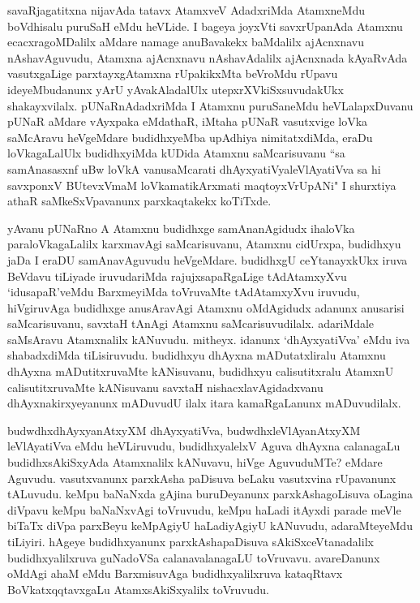 
\begin{artha}
savaRjagatitxna nijavAda tatavx AtamxveV AdadxriMda AtamxneMdu boVdhisalu puruSaH eMdu heVLide. I bageya joyxVti savxrUpanAda Atamxnu ecacxragoMDalilx aMdare namage anuBavakekx baMdalilx ajAcnxnavu nAshavAguvudu, Atamxna ajAcnxnavu nAshavAdalilx ajAcnxnada kAyaRvAda vasutxgaLige parxtayxgAtamxna rUpakikxMta beVroMdu rUpavu ideyeMbudanunx yArU yAvakAladalUlx utepxrXVkiSxsuvudakUkx shakayxvilalx. pUNaRnAdadxriMda I Atamxnu puruSaneMdu heVLalapxDuvanu pUNaR aMdare vAyxpaka eMdathaR, iMtaha pUNaR vasutxvige loVka saMcAravu heVgeMdare budidhxyeMba upAdhiya nimitatxdiMda, eraDu loVkagaLalUlx budidhxyiMda kUDida Atamxnu saMcarisuvanu ``sa samAnasasxnf uBw loVkA vanusaMcarati dhAyxyatiVyaleVlAyatiVva sa hi savxponxV BUtevxVmaM loVkamatikArxmati maqtoyxVrUpANi" I shurxtiya athaR saMkeSxVpavanunx parxkaqtakekx koTiTxde.
\end{artha}%



\begin{artha}
yAvanu pUNaRno A Atamxnu budidhxge samAnanAgidudx ihaloVka paraloVkagaLalilx karxmavAgi saMcarisuvanu, Atamxnu cidUrxpa, budidhxyu jaDa I eraDU samAnavAguvudu heVgeMdare. budidhxgU ceYtanayxkUkx iruva BeVdavu tiLiyade iruvudariMda rajujxsapaRgaLige tAdAtamxyXvu `idusapaR'veMdu BarxmeyiMda toVruvaMte tAdAtamxyXvu iruvudu, hiVgiruvAga budidhxge anusAravAgi Atamxnu oMdAgidudx adanunx anusarisi saMcarisuvanu, savxtaH tAnAgi Atamxnu saMcarisuvudilalx. adariMdale saMsAravu Atamxnalilx kANuvudu. mitheyx. idanunx `dhAyxyatiVva' eMdu iva shabadxdiMda tiLisiruvudu. budidhxyu dhAyxna mADutatxliralu Atamxnu dhAyxna mADutitxruvaMte kANisuvanu, budidhxyu calisutitxralu AtamxnU calisutitxruvaMte kANisuvanu savxtaH nishacxlavAgidadxvanu dhAyxnakirxyeyanunx mADuvudU ilalx itara kamaRgaLanunx mADuvudilalx. 
\end{artha}

\begin{artha}%
budwdhxdhAyxyanAtxyXM dhAyxyatiVva, budwdhxleVlAyanAtxyXM leVlAyatiVva eMdu heVLiruvudu, budidhxyalelxV Aguva dhAyxna calanagaLu budidhxsAkiSxyAda Atamxnalilx kANuvavu, hiVge AguvuduMTe? eMdare Aguvudu. vasutxvanunx parxkAsha paDisuva beLaku vasutxvina rUpavanunx tALuvudu. keMpu baNaNxda gAjina buruDeyanunx parxkAshagoLisuva oLagina diVpavu keMpu baNaNxvAgi toVruvudu, keMpu haLadi itAyxdi parade meVle biTaTx diVpa parxBeyu keMpAgiyU haLadiyAgiyU kANuvudu, adaraMteyeMdu tiLiyiri. hAgeye budidhxyanunx parxkAshapaDisuva sAkiSxceVtanadalilx budidhxyalilxruva guNadoVSa calanavalanagaLU toVruvavu. avareDanunx oMdAgi ahaM eMdu BarxmisuvAga budidhxyalilxruva kataqRtavx BoVkatxqqtavxgaLu AtamxsAkiSxyalilx toVruvudu. 
\end{artha}

